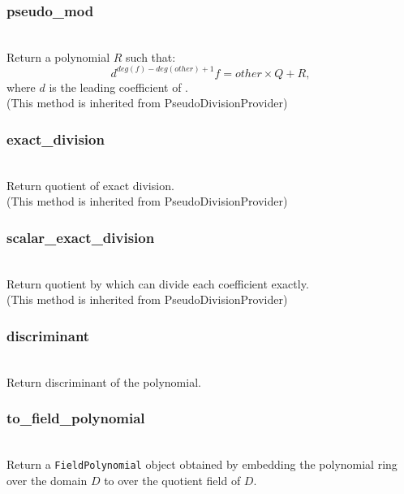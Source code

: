   \subsubsection{pseudo\_mod}
  \\
  \spacing
  \quad Return a polynomial \(R\) such that:
  \[ d^{deg(f) - deg(other) + 1} f = other \times Q + R,\]
  where \(d\) is the leading coefficient of .\\
  (This method is inherited from PseudoDivisionProvider)

  \subsubsection{exact\_division}
  \\
  \spacing
  \quad Return quotient of exact division.\\
  (This method is inherited from PseudoDivisionProvider)

  \subsubsection{scalar\_exact\_division}
  \\
  \spacing
  \quad Return quotient by  which can divide each
  coefficient exactly.\\
  (This method is inherited from PseudoDivisionProvider)

  \subsubsection{discriminant}
  \\
  \spacing
  \quad Return discriminant of the polynomial.

  \subsubsection{to\_field\_polynomial}
  \\
  \spacing
  \quad Return a {\tt FieldPolynomial} object obtained by embedding
  the polynomial ring over the domain \(D\) to over the quotient
  field of \(D\).


